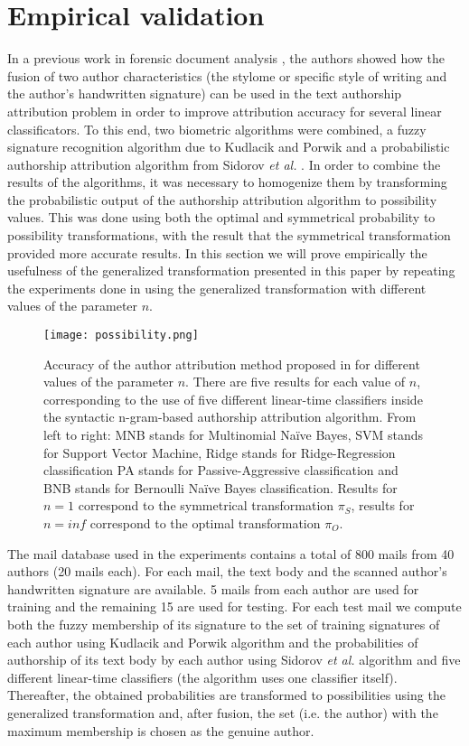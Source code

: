 \documentclass[a4paper]{article}
\begin{document}
\section{Empirical validation}
In a previous work in forensic document analysis \cite{DBLP:journals/corr/abs-1902-02176, Sayyed2018}, the authors showed how the fusion of two author characteristics (the stylome or specific style of writing and the author's handwritten signature) can be used in the text authorship attribution problem in order to improve attribution accuracy for several linear classificators. To this end, two biometric algorithms were combined, a fuzzy signature recognition algorithm due to Kudlacik and Porwik \cite{Kudlacik2014} and a probabilistic authorship attribution algorithm from Sidorov \emph{et al.} \cite{Sidorov}. In order to combine the results of the algorithms, it was necessary to homogenize them by transforming the probabilistic output of the authorship attribution algorithm to possibility values. This was done using both the optimal and symmetrical probability to possibility transformations, with the result that the symmetrical transformation provided more accurate results. In this section we will prove empirically the usefulness of the generalized transformation presented in this paper by repeating the experiments done in \cite{DBLP:journals/corr/abs-1902-02176, Sayyed2018} using the generalized transformation with different values of the parameter $n$.
\begin{figure}
\centering
\texttt{[image: possibility.png]}
\caption{\label{fig:possibility} Accuracy of the author attribution method proposed in \cite{DBLP:journals/corr/abs-1902-02176} for different values of the parameter $n$. There are five results for each value of $n$, corresponding to the use of five different linear-time classifiers inside the syntactic n-gram-based authorship attribution algorithm. From left to right: MNB stands for Multinomial Naïve Bayes, SVM stands for Support Vector Machine, Ridge stands for Ridge-Regression classification  PA stands for Passive-Aggressive classification and BNB stands for Bernoulli Naïve Bayes classification. Results for $n=1$ correspond to the symmetrical transformation $\pi_S$, results for $n=inf$ correspond to the optimal transformation $\pi_O$.}
\end{figure}

The mail database used in the experiments contains a total of 800 mails from 40 authors (20 mails each). For each mail, the text body and the scanned author's handwritten signature are available. 5 mails from each author are used for training and the remaining 15 are used for testing. For each test mail we compute both the fuzzy membership of its signature to the set of training signatures of each author using Kudlacik and Porwik algorithm \cite{Kudlacik2014} and the probabilities of authorship of its text body by each author using Sidorov \emph{et al.} algorithm \cite{Sidorov} and five different linear-time classifiers (the algorithm uses one classifier itself). Thereafter, the obtained probabilities are transformed to possibilities using the generalized transformation and, after fusion, the set (i.e. the author) with the maximum membership is chosen as the genuine author.
\end{document}
